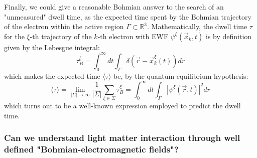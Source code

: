 \documentclass[11pt, a4paper]{article} %
\newcommand{\R}{\mathbb{R}} %
\begin{document}
Finally, we could give a reasonable Bohmian answer to the search of an "unmeasured" dwell time, as the expected time spent by the Bohmian trajectory of the electron within the active region $\Gamma\subset \R^3$. Mathematically, the dwell time $\tau$ for the $\xi$-th trajectory of the $k$-th electron with EWF $\psi^\xi(\vec{x}_k,t)$ is by definition given by the Lebesgue integral:
\begin{equation}
\tau^\xi_B= \int_{0}^\infty  dt \int_\Gamma \delta(\vec{r}-\vec{x}_k^\xi(t)) dr
\end{equation}
which makes the expected time $\langle \tau\rangle$ be, by the quantum equilibrium hypothesis:
\begin{equation}
\langle \tau \rangle = \lim_{|\Sigma|\rightarrow \infty}\frac{1}{|\Sigma|} \sum_{\xi\in\Sigma} \tau_B^\xi = \int_{0}^\infty dt \int_\Gamma |\psi^\xi(\vec{r},t)|^2dr
\end{equation}
which turns out to be a well-known expression employed to predict the dwell time.

\subsubsection*{Can we understand light matter interaction through well defined "Bohmian-electromagnetic fields"?}
\end{document}
